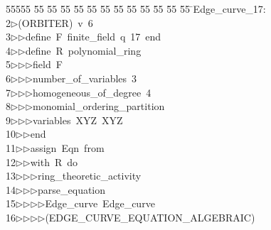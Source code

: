 %
%
\begin{tabbing}
55555 \= 55 \= 55 \= 55 \= 55 \= 55 \= 55 \= 55 \= 55 \= 55 \= 55 \= 55 \= 55 \= \>Edge\_curve\_17:\\[0pt]
2\>$\triangleright$\>(ORBITER)\ v\ 6\ \\[0pt]
3\>$\triangleright$\>$\triangleright$\>define\ F\ finite\_field\ q\ 17\ end\ \\[0pt]
4\>$\triangleright$\>$\triangleright$\>define\ R\ polynomial\_ring\ \\[0pt]
5\>$\triangleright$\>$\triangleright$\>$\triangleright$\>field\ F\ \\[0pt]
6\>$\triangleright$\>$\triangleright$\>$\triangleright$\>number\_of\_variables\ 3\ \\[0pt]
7\>$\triangleright$\>$\triangleright$\>$\triangleright$\>homogeneous\_of\_degree\ 4\ \\[0pt]
8\>$\triangleright$\>$\triangleright$\>$\triangleright$\>monomial\_ordering\_partition\ \\[0pt]
9\>$\triangleright$\>$\triangleright$\>$\triangleright$\>variables\ XYZ\ XYZ\ \\[0pt]
10\>$\triangleright$\>$\triangleright$\>end\ \\[0pt]
11\>$\triangleright$\>$\triangleright$\>assign\ Eqn\ from\ \\[0pt]
12\>$\triangleright$\>$\triangleright$\>with\ R\ do\ \\[0pt]
13\>$\triangleright$\>$\triangleright$\>$\triangleright$\>ring\_theoretic\_activity\ \\[0pt]
14\>$\triangleright$\>$\triangleright$\>$\triangleright$\>parse\_equation\ \\[0pt]
15\>$\triangleright$\>$\triangleright$\>$\triangleright$\>$\triangleright$\>Edge\_curve\ Edge\_curve\ \\[0pt]
16\>$\triangleright$\>$\triangleright$\>$\triangleright$\>$\triangleright$\>(EDGE\_CURVE\_EQUATION\_ALGEBRAIC)\ \\[0pt]

\end{tabbing}
